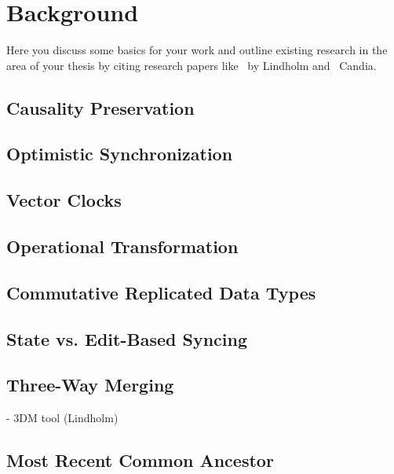 
\chapter{Background}\label{background}

Here you discuss some basics for your work and outline existing research in the area of your thesis by citing research papers like~\cite{Lindholm:2009wo} by Lindholm and~\cite{DeCandia:2007ui,Ratner:2001wz} Candia.

\section{Causality Preservation}
\section{Optimistic Synchronization}
\section{Vector Clocks}
\section{Operational Transformation}
\section{Commutative Replicated Data Types}
\section{State vs. Edit-Based Syncing}
\section{Three-Way Merging}
- 3DM tool (Lindholm)
\section{Most Recent Common Ancestor}